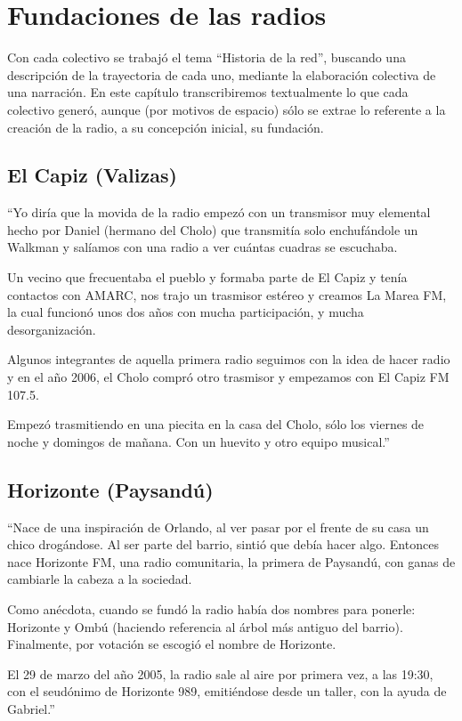 \chapter{Fundaciones de las radios}
\indent Con cada colectivo se trabajó el tema ``Historia de la red'', buscando una descripción de la trayectoria de cada uno, mediante la elaboración colectiva de una narración. En este capítulo transcribiremos textualmente lo que cada colectivo generó, aunque (por motivos de espacio) sólo se extrae lo referente a la creación de la radio, a su concepción inicial, su fundación.\\

\section*{El Capiz (Valizas)}
``Yo diría que la movida de la radio empezó con un transmisor muy elemental hecho por Daniel (hermano del Cholo) que transmitía solo enchufándole un Walkman y salíamos con una radio a ver cuántas cuadras se escuchaba.

Un vecino que frecuentaba el pueblo y formaba parte de El Capiz y tenía contactos con AMARC, nos trajo un trasmisor estéreo y creamos La Marea FM, la cual funcionó unos dos años con mucha participación, y mucha desorganización.

Algunos integrantes de aquella primera radio seguimos con la idea de hacer radio y en el año 2006, el Cholo compró otro trasmisor y empezamos con El Capiz FM 107.5.

Empezó trasmitiendo en una piecita en la casa del Cholo, sólo los viernes de noche y domingos de mañana. Con un huevito y otro equipo musical.''

\section*{Horizonte (Paysandú)}
``Nace de una inspiración de Orlando, al ver pasar por el frente de su casa un chico drogándose. Al ser parte del barrio, sintió que debía hacer algo.
Entonces nace Horizonte FM, una radio comunitaria, la primera de Paysandú, con ganas de cambiarle la cabeza a la sociedad.

Como anécdota, cuando se fundó la radio había dos nombres para ponerle: Horizonte y Ombú (haciendo referencia al árbol más antiguo del barrio). Finalmente, por votación se escogió el nombre de Horizonte.

El 29 de marzo del año 2005, la radio sale al aire por primera vez, a las 19:30, con el seudónimo de Horizonte 989, emitiéndose desde un taller, con la ayuda de Gabriel.''

